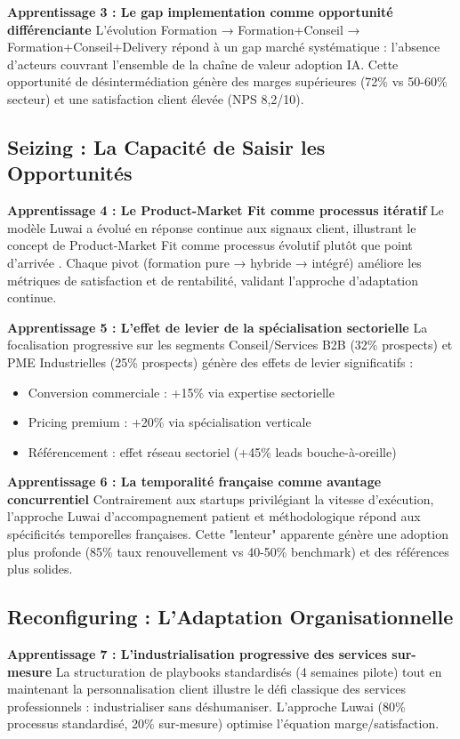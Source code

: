 \textbf{Apprentissage 3 : Le gap implementation comme opportunité différenciante}
L'évolution Formation → Formation+Conseil → Formation+Conseil+Delivery répond à un gap marché systématique : l'absence d'acteurs couvrant l'ensemble de la chaîne de valeur adoption IA. Cette opportunité de désintermédiation génère des marges supérieures (72\% vs 50-60\% secteur) et une satisfaction client élevée (NPS 8,2/10).

\subsection{Seizing : La Capacité de Saisir les Opportunités}

\textbf{Apprentissage 4 : Le Product-Market Fit comme processus itératif}
Le modèle Luwai a évolué en réponse continue aux signaux client, illustrant le concept de Product-Market Fit comme processus évolutif plutôt que point d'arrivée \cite{blank2013startup}. Chaque pivot (formation pure → hybride → intégré) améliore les métriques de satisfaction et de rentabilité, validant l'approche d'adaptation continue.

\textbf{Apprentissage 5 : L'effet de levier de la spécialisation sectorielle}
La focalisation progressive sur les segments Conseil/Services B2B (32\% prospects) et PME Industrielles (25\% prospects) génère des effets de levier significatifs :
\begin{itemize}
    \item Conversion commerciale : +15\% via expertise sectorielle
    \item Pricing premium : +20\% via spécialisation verticale
    \item Référencement : effet réseau sectoriel (+45\% leads bouche-à-oreille)
\end{itemize}

\textbf{Apprentissage 6 : La temporalité française comme avantage concurrentiel}
Contrairement aux startups privilégiant la vitesse d'exécution, l'approche Luwai d'accompagnement patient et méthodologique répond aux spécificités temporelles françaises. Cette "lenteur" apparente génère une adoption plus profonde (85\% taux renouvellement vs 40-50\% benchmark) et des références plus solides.

\subsection{Reconfiguring : L'Adaptation Organisationnelle}

\textbf{Apprentissage 7 : L'industrialisation progressive des services sur-mesure}
La structuration de playbooks standardisés (4 semaines pilote) tout en maintenant la personnalisation client illustre le défi classique des services professionnels : industrialiser sans déshumaniser. L'approche Luwai (80\% processus standardisé, 20\% sur-mesure) optimise l'équation marge/satisfaction.

